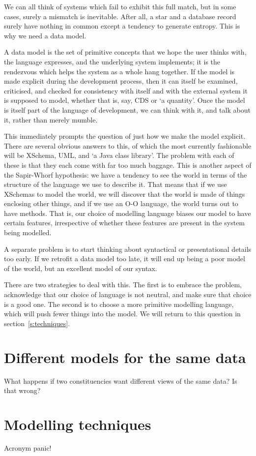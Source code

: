\documentclass[a4paper]{article}
\begin{document}
We can all think of systems which fail to exhibit this full match, but
in some cases, surely a mismatch is inevitable.  After all, a star and
a database record surely have nothing in common except a tendency to
generate entropy.  This is why we need a data model.

A data model is the set of primitive concepts that we hope the user
thinks with, the language expresses, and the underlying system
implements; it is the rendezvous which helps the system as a whole
hang together.  If the model is made explicit during the development
process, then it can itself be examined, criticised, and checked for
consistency with itself and with the external system it is
supposed to model, whether that is, say, CDS or `a quantity'.  Once
the model is itself part of the language of development, we can think
with it, and talk about it, rather than merely mumble.

This immediately prompts the question of just how we make the model
explicit.  There are several obvious answers to this, of which the
most currently fashionable will be XSchema, UML, and `a Java
class library'.  The problem with each of these is that they each come with
far too much baggage.  This is another aspect of the Sapir-Whorf
hypothesis: we have a tendency to see the world in terms of the
structure of the language we use to describe it.  That means that if
we use XSchemas to model the world, we will discover that the world is
made of things enclosing other things, and if we use an O-O language,
the world turns out to have methods.  That is, our choice of modelling
language biases our model to have certain features, irrespective of
whether these features are present in the system being modelled.

A separate problem is to start thinking about syntactical or
presentational details too early.  If we retrofit a data model too
late, it will end up being a poor model of the world, but an excellent
model of our syntax.

There are two strategies to deal with this.  The first is to embrace
the problem, acknowledge that our choice of language is not neutral,
and make sure that choice is a good one.  The second is to choose a
more primitive modelling language, which will push fewer things into
the model.  We will return to this question in section~\ref{s:techniques}.



\section{Different models for the same data}

What happens if two constituencies want different views of the same
data?  Is that wrong?

\section{Modelling techniques\label{s:techniques}}

Acronym panic!
\end{document}
